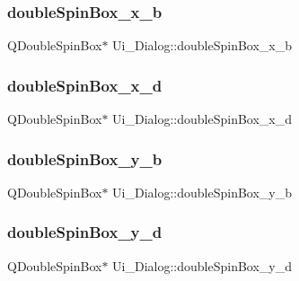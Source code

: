 \subsubsection{\texorpdfstring{double\+Spin\+Box\+\_\+x\+\_\+b}{doubleSpinBox\_x\_b}}
{\footnotesize\ttfamily Q\+Double\+Spin\+Box$\ast$ Ui\+\_\+\+Dialog\+::double\+Spin\+Box\+\_\+x\+\_\+b}

\hypertarget{class_ui___dialog_a979c774889164d711599270126aa7f7a}{}\label{class_ui___dialog_a979c774889164d711599270126aa7f7a} 
\subsubsection{\texorpdfstring{double\+Spin\+Box\+\_\+x\+\_\+d}{doubleSpinBox\_x\_d}}
{\footnotesize\ttfamily Q\+Double\+Spin\+Box$\ast$ Ui\+\_\+\+Dialog\+::double\+Spin\+Box\+\_\+x\+\_\+d}

\hypertarget{class_ui___dialog_aa3d1e02dcb0016a94ac9810fff2c55f4}{}\label{class_ui___dialog_aa3d1e02dcb0016a94ac9810fff2c55f4} 
\subsubsection{\texorpdfstring{double\+Spin\+Box\+\_\+y\+\_\+b}{doubleSpinBox\_y\_b}}
{\footnotesize\ttfamily Q\+Double\+Spin\+Box$\ast$ Ui\+\_\+\+Dialog\+::double\+Spin\+Box\+\_\+y\+\_\+b}

\hypertarget{class_ui___dialog_a81747c4db62ac24a132abe8cf5270405}{}\label{class_ui___dialog_a81747c4db62ac24a132abe8cf5270405} 
\subsubsection{\texorpdfstring{double\+Spin\+Box\+\_\+y\+\_\+d}{doubleSpinBox\_y\_d}}
{\footnotesize\ttfamily Q\+Double\+Spin\+Box$\ast$ Ui\+\_\+\+Dialog\+::double\+Spin\+Box\+\_\+y\+\_\+d}

